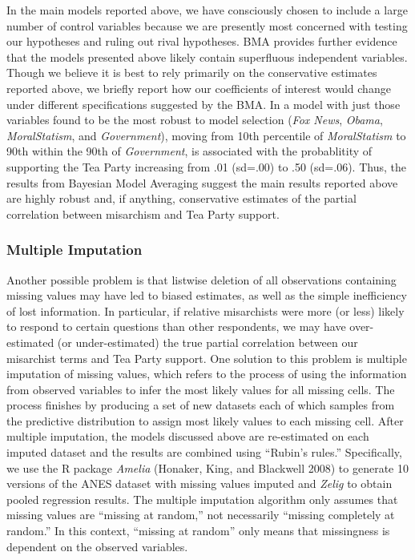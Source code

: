 \documentclass[12pt,]{article}
\begin{document}
In the main models reported above, we have consciously chosen to include
a large number of control variables because we are presently most
concerned with testing our hypotheses and ruling out rival hypotheses.
BMA provides further evidence that the models presented above likely
contain superfluous independent variables. Though we believe it is best
to rely primarily on the conservative estimates reported above, we
briefly report how our coefficients of interest would change under
different specifications suggested by the BMA. In a model with just
those variables found to be the most robust to model selection
(\emph{Fox News}, \emph{Obama}, \emph{MoralStatism}, and
\emph{Government}), moving from 10th percentile of \emph{MoralStatism}
to 90th within the 90th of \emph{Government}, is associated with the
probablitity of supporting the Tea Party increasing from .01 (sd=.00) to
.50 (sd=.06). Thus, the results from Bayesian Model Averaging suggest
the main results reported above are highly robust and, if anything,
conservative estimates of the partial correlation between misarchism and
Tea Party support.

\subsubsection{Multiple Imputation}\label{multiple-imputation}

Another possible problem is that listwise deletion of all observations
containing missing values may have led to biased estimates, as well as
the simple inefficiency of lost information. In particular, if relative
misarchists were more (or less) likely to respond to certain questions
than other respondents, we may have over-estimated (or under-estimated)
the true partial correlation between our misarchist terms and Tea Party
support. One solution to this problem is multiple imputation of missing
values, which refers to the process of using the information from
observed variables to infer the most likely values for all missing
cells. The process finishes by producing a set of new datasets each of
which samples from the predictive distribution to assign most likely
values to each missing cell. After multiple imputation, the models
discussed above are re-estimated on each imputed dataset and the results
are combined using ``Rubin's rules.'' Specifically, we use the R package
\emph{Amelia} (Honaker, King, and Blackwell 2008) to generate 10
versions of the ANES dataset with missing values imputed and
\emph{Zelig} to obtain pooled regression results. The multiple
imputation algorithm only assumes that missing values are ``missing at
random,'' not necessarily ``missing completely at random.'' In this
context, ``missing at random'' only means that missingness is dependent
on the observed variables.
\end{document}
